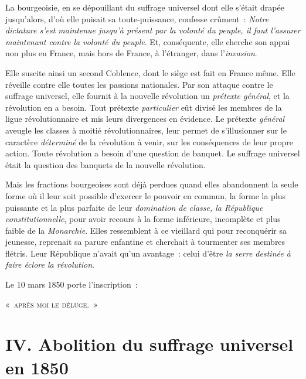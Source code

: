 \documentclass[french,twoside]{book} %
\newcommand\chapteropen{} %
\newcommand\chapterclose{} %
\begin{document}
La bourgeoisie, en se dépouillant du suffrage universel dont elle s’était drapée jusqu’alors, d’où elle puisait sa toute-puissance, confesse crûment : \emph{Notre dictature s’est maintenue jusqu’à présent par la volonté du peuple, il faut l’assurer maintenant contre la volonté du peuple}. Et, conséquente, elle cherche son appui non plus en France, mais hors de France, à l’étranger, dans l’\emph{invasion}.\par
Elle suscite ainsi un second Coblence, dont le siège est fait en France même. Elle réveille contre elle toutes les passions nationales. Par son attaque contre le suffrage universel, elle fournit à la nouvelle révolution un \emph{prétexte général}, et la révolution en a besoin. Tout prétexte \emph{particulier} eût divisé les membres de la ligue révolutionnaire et mis leurs divergences en évidence. Le prétexte \emph{général} aveugle les classes à moitié révolutionnaires, leur permet de s’illusionner sur le caractère \emph{déterminé} de la révolution à venir, sur les conséquences de leur propre action. Toute révolution a besoin d’une question de banquet. Le suffrage universel était la question des banquets de la nouvelle révolution.\par
Mais les fractions bourgeoises sont déjà perdues quand elles abandonnent la seule forme où il leur soit possible d’exercer le pouvoir en commun, la forme la plus puissante et la plus parfaite de leur \emph{domination de classe, la République constitutionnelle}, pour avoir recours à la forme inférieure, incomplète et plus faible de la \emph{Monarchie}. Elles ressemblent à ce vieillard qui pour reconquérir sa jeunesse, reprenait sa parure enfantine et cherchait à tourmenter ses membres flétris. Leur République n’avait qu’un avantage : celui d’être \emph{la serre destinée à faire éclore la révolution}.\par
Le 10 mars 1850 porte l’inscription :\par

\begin{center}
\noindent « {\scshape après moi le déluge}. »
\end{center}

\chapterclose


\chapteropen

\chapter[{IV. Abolition du suffrage universel en 1850}]{IV. Abolition du suffrage universel en 1850}
\renewcommand{\leftmark}{IV. Abolition du suffrage universel en 1850}
\end{document}
